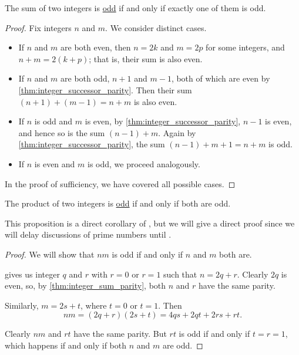 \begin{proposition}\label{thm:integer_sum_parity}
  The sum of two integers is \hyperref[def:integer_parity]{odd} if and only if exactly one of them is odd.
\end{proposition}
\begin{proof}
  \SufficiencySubProof Fix integers \( n \) and \( m \). We consider distinct cases.

  \begin{itemize}
    \item If \( n \) and \( m \) are both even, then \( n = 2k \) and \( m = 2p \) for some integers, and \( n + m = 2(k + p) \); that is, their sum is also even.

    \item If \( n \) and \( m \) are both odd, \( n + 1 \) and \( m - 1 \), both of which are even by \cref{thm:integer_successor_parity}. Then their sum \( (n + 1) + (m - 1) = n + m \) is also even.

    \item If \( n \) is odd and \( m \) is even, by \cref{thm:integer_successor_parity}, \( n - 1 \) is even, and hence so is the sum \( (n - 1) + m \). Again by \cref{thm:integer_successor_parity}, the sum \( (n - 1) + m + 1 = n + m \) is odd.

    \item If \( n \) is even and \( m \) is odd, we proceed analogously.
  \end{itemize}

  \NecessitySubProof In the proof of sufficiency, we have covered all possible cases.
\end{proof}

\begin{proposition}\label{thm:integer_product_parity}
  The product of two integers is \hyperref[def:integer_parity]{odd} if and only if both are odd.
\end{proposition}
\begin{comments}
  \item This proposition is a direct corollary of , but we will give a direct proof since we will delay discussions of prime numbers until .
\end{comments}
\begin{proof}
  We will show that \( nm \) is odd if and only if \( n \) and \( m \) both are.

   gives us integer \( q \) and \( r \) with \( r = 0 \) or \( r = 1 \) such that \( n = 2q + r \). Clearly \( 2q \) is even, so, by \cref{thm:integer_sum_parity}, both \( n \) and \( r \) have the same parity.

  Similarly, \( m = 2s + t \), where \( t = 0 \) or \( t = 1 \). Then
  \begin{equation*}
    nm = (2q + r) (2s + t) = 4qs + 2qt + 2rs + rt.
  \end{equation*}

  Clearly \( nm \) and \( rt \) have the same parity. But \( rt \) is odd if and only if \( t = r = 1 \), which happens if and only if both \( n \) and \( m \) are odd.
\end{proof}

